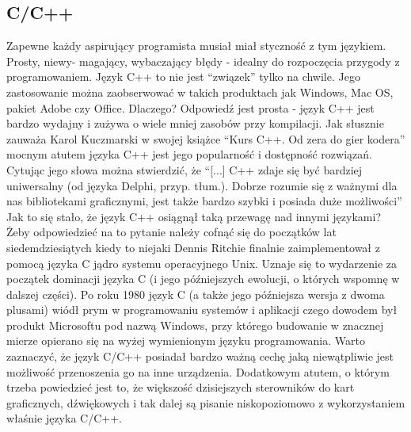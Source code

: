 \documentclass{article}
\begin{document}
	\subsection{C/C++}
	Zapewne każdy aspirujący programista musiał miał styczność z tym językiem. Prosty, niewy- magający, wybaczający błędy - idealny do rozpoczęcia przygody z programowaniem. Język C++ to nie jest “związek” tylko na chwile. Jego zastosowanie można zaobserwować w takich produktach jak Windows, Mac OS, pakiet Adobe czy Office. Dlaczego? Odpowiedź jest prosta - język C++ jest bardzo wydajny i zużywa o wiele mniej zasobów przy kompilacji. Jak słusznie zauważa Karol Kuczmarski w swojej książce “Kurs C++. Od zera do gier kodera” \cite{ref10} mocnym atutem języka C++ jest jego popularność i dostępność rozwiązań. Cytując jego słowa można stwierdzić, że “[...] C++ zdaje się być bardziej uniwersalny (od języka Delphi, przyp. tłum.). Dobrze rozumie się z ważnymi dla nas bibliotekami graficznymi, jest także bardzo szybki i posiada duże możliwości” Jak to się stało, że język C++ osiągnął taką przewagę nad innymi językami? Żeby odpowiedzieć na to pytanie należy cofnąć się do początków lat siedemdziesiątych kiedy to niejaki Dennis Ritchie finalnie zaimplementował z pomocą języka C jądro systemu operacyjnego Unix. Uznaje się to wydarzenie za początek dominacji języka C (i jego późniejszych ewolucji, o których 
	wspomnę w dalszej części). Po roku 1980 język C (a także jego późniejsza wersja z dwoma plusami) wiódł prym w programowaniu systemów i aplikacji czego dowodem był produkt Microsoftu pod nazwą Windows, przy którego budowanie w znacznej mierze opierano się na wyżej wymienionym języku programowania. Warto zaznaczyć, że język C/C++ posiadał bardzo ważną cechę jaką niewątpliwie jest możliwość przenoszenia go na inne urządzenia. Dodatkowym atutem, o którym trzeba powiedzieć jest to, że większość dzisiejszych sterowników do kart graficznych, dźwiękowych i tak dalej są pisanie niskopoziomowo z wykorzystaniem właśnie języka C/C++.
\end{document}
